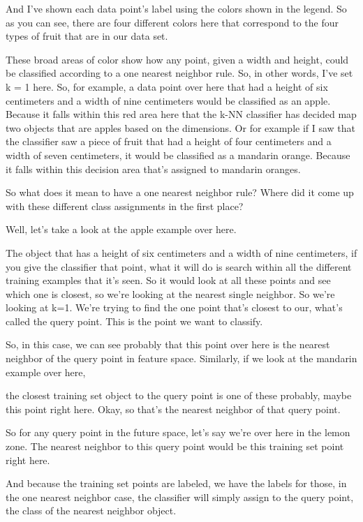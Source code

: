 \begin{multicols}{2}
And I've shown each data point's label using the colors shown in the legend. So as you can see, there are four different colors here that correspond to the four types of fruit that are in our data set. 

These broad areas of color show how any point, given a width and height, could be classified according to a one nearest neighbor rule. So, in other words, I've set k = 1 here. So, for example, a data point over here that had a height of six centimeters and a width of nine centimeters would be classified as an apple. Because it falls within this red area here that the k-NN classifier has decided map two objects that are apples based on the dimensions. Or for example if I saw that the classifier saw a piece of fruit that had a height of four centimeters and a width of seven centimeters, it would be classified as a mandarin orange. Because it falls within this decision area that's assigned to mandarin oranges. 

So what does it mean to have a one nearest neighbor rule? Where did it come up with these different class assignments in the first place? 

Well, let's take a look at the apple example over here. 

The object that has a height of six centimeters and a width of nine centimeters, if you give the classifier that point, what it will do is search within all the different training examples that it's seen. So it would look at all these points and see which one is closest, so we're looking at the nearest single neighbor. So we're looking at k=1. We're trying to find the one point that's closest to our, what's called the query point. This is the point we want to classify. 

So, in this case, we can see probably that this point over here is the nearest neighbor of the query point in feature space. Similarly, if we look at the mandarin example over here, 

the closest training set object to the query point is one of these probably, maybe this point right here. Okay, so that's the nearest neighbor of that query point. 

So for any query point in the future space, let's say we're over here in the lemon zone. The nearest neighbor to this query point would be this training set point right here. 

And because the training set points are labeled, we have the labels for those, in the one nearest neighbor case, the classifier will simply assign to the query point, the class of the nearest neighbor object. 


\end{multicols}
